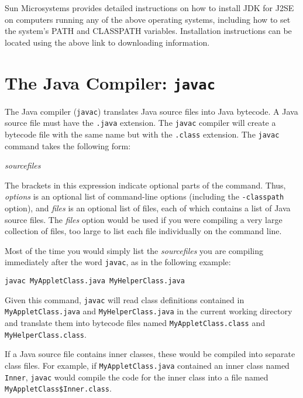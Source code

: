 \noindent Sun Microsystems provides detailed instructions on how
to install JDK for J2SE on computers running any of the above operating
systems, including how to set the system's PATH and CLASSPATH variables.
Installation instructions can be located using the above link to
downloading information.

\section*{The Java Compiler: {\tt javac}}
\noindent The Java compiler ({\tt javac}) translates Java source files into Java
bytecode.  A Java source file must have the {\tt .java} extension.   The
{\tt javac} compiler will create a bytecode file with the same name
but with the {\tt .class} extension.  The {\tt javac} command takes
the following form:

\vspace{6pt plus3pt minus2pt}
 \qquad 
 [ {\it options} ] \qquad 
 {\it sourcefiles} \qquad 
 [ {\it files} ]

\vspace{6pt plus3pt minus2pt}\noindent The brackets in this expression indicate optional parts of
the command.   Thus, {\it options} is an optional list of command-line options 
(including the {\tt -classpath} option), and
{\it files} is an optional list of files, each of which contains a
list of Java source files.   The {\it files} option would be used if
you were compiling a very large collection of files, too large to list
each file individually on the command line.

Most of the time you would simply list the {\it sourcefiles} you are
compiling immediately after the word {\tt javac}, as in the
following example:

\begin{jjjlisting}
\begin{lstlisting}
javac MyAppletClass.java MyHelperClass.java
\end{lstlisting}
\end{jjjlisting}

\noindent Given this command, {\tt javac} will read class
definitions contained in {\tt MyAppletClass.java} and {\tt MyHelperClass.java}
in the current working directory
and translate them into bytecode files named {\tt MyAppletClass.class} and
{\tt MyHelperClass.class}.

If a Java source file contains inner classes, these would be compiled
into separate class files.  For example, if {\tt MyAppletClass.java}
contained an inner class named {\tt Inner}, {\tt javac} would compile
the code for the inner class into a file named {\tt
MyAppletClass\$Inner.class}.

